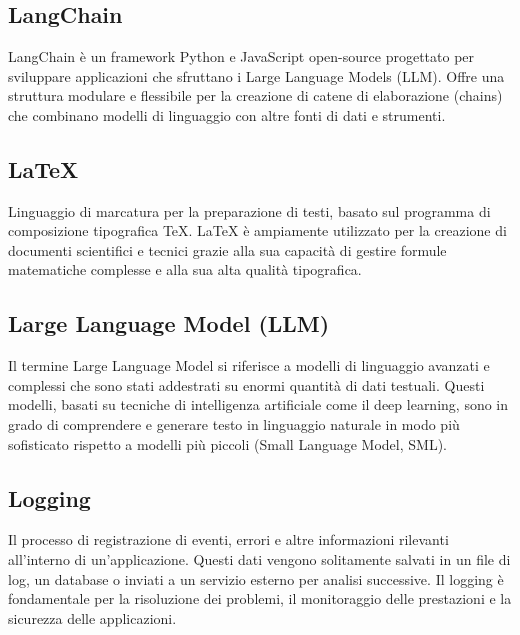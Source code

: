 \section{}

\hypertarget{sec:langchain}{}
\subsection*{LangChain}
LangChain è un framework Python e JavaScript open-source progettato per sviluppare applicazioni che sfruttano i Large Language Models 
(LLM). Offre una struttura modulare e flessibile per la creazione di catene di elaborazione (chains) che combinano modelli di 
linguaggio con altre fonti di dati e strumenti.

\subsection*{\LaTeX}
Linguaggio di marcatura per la preparazione di testi, basato sul programma di composizione tipografica TeX. LaTeX è ampiamente utilizzato per la creazione 
di documenti scientifici e tecnici grazie alla sua capacità di gestire formule matematiche complesse e alla sua alta qualità tipografica.

\hypertarget{sec:LLM}{}
\subsection*{Large Language Model (LLM)}
Il termine Large Language Model si riferisce a modelli di linguaggio avanzati e complessi che sono stati addestrati su enormi quantità di dati testuali. 
Questi modelli, basati su tecniche di intelligenza artificiale come il deep learning, sono in grado di comprendere e generare testo in linguaggio naturale 
in modo più sofisticato rispetto a modelli più piccoli (Small Language Model, SML).

\hypertarget{sec:logging}{}
\subsection*{Logging}
Il processo di registrazione di eventi, errori e altre informazioni rilevanti all'interno di un'applicazione. Questi dati vengono 
solitamente salvati in un file di log, un database o inviati a un servizio esterno per analisi successive. Il logging è fondamentale 
per la risoluzione dei problemi, il monitoraggio delle prestazioni e la sicurezza delle applicazioni.

\newpage